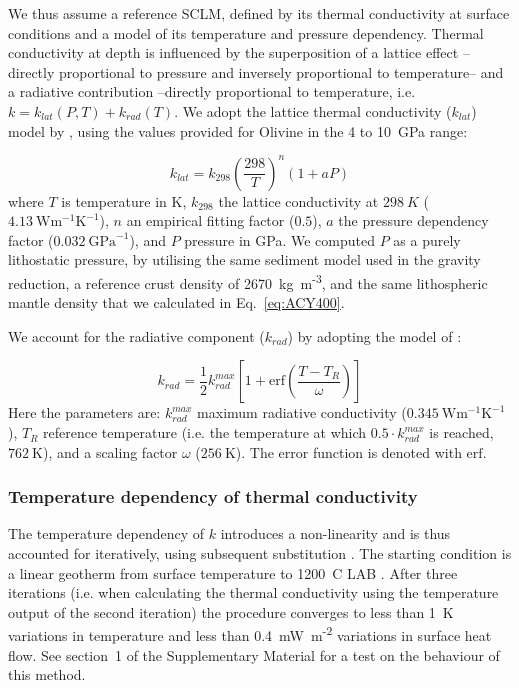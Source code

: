 We thus assume a reference SCLM, defined by its thermal conductivity at surface conditions and a model of its temperature and pressure dependency.
Thermal conductivity at depth is influenced by the superposition of a lattice effect --directly proportional to pressure and inversely proportional to temperature-- and a radiative contribution --directly proportional to temperature, i.e. $k = k_{lat}(P,T) + k_{rad}(T)$.
We adopt the lattice thermal conductivity ($k_{lat}$) model by \textcite{Xu2004}, using the values provided for Olivine in the 4 to 10~GPa range:

\begin{equation}
	\label{kLat}
	k_{lat} = k_{298} \left( \frac{298}{T} \right)^n (1+ a P)
\end{equation}
where $T$ is temperature in K, $k_{298}$ the lattice conductivity at $298~K$ ($4.13~\textrm{W} \textrm{m}^{-1} \textrm{K}^{-1}$), $n$ an empirical fitting factor ($0.5$), $a$ the pressure dependency factor ($0.032~\textrm{GPa}^{-1}$), and $P$ pressure in GPa.
We computed $P$ as a purely lithostatic pressure, by utilising the same sediment model used in the gravity reduction, a reference crust density of 2670~{kg~m\textsuperscript{-3}}, and the same lithospheric mantle density that we calculated in Eq.~\ref{eq:ACY400}.

We account for the radiative component ($k_{rad}$) by adopting the model of \textcite{Hasterok2011cont}:

\begin{equation}
	\label{kRad}
	k_{rad} = \frac{1}{2} k_{rad}^{max}  \left[ 1 + \mathrm{erf} \left( \frac{T-T_R}{\omega} \right) \right]
\end{equation}
Here the parameters are: $k_{rad}^{max}$ maximum radiative conductivity ($0.345~\textrm{W} \textrm{m}^{-1} \textrm{K}^{-1}$), $T_R$ reference temperature (i.e. the temperature at which $0.5 \cdot k_{rad}^{max}$ is reached, $762~\textrm{K}$), and a scaling factor $\omega$ ($256~\textrm{K}$).
The error function is denoted with $\mathrm{erf}$.

\subsubsection{Temperature dependency of thermal conductivity}
\label{sss:ThermCondTdep}
The temperature dependency of $k$ introduces a non-linearity and is thus accounted for iteratively, using subsequent substitution \parencite[or `Picard's method', e.g. ][]{Hauck1999}.
The starting condition is a linear geotherm from surface temperature to 1200~\textdegree C LAB \parencite{fischer2010lab}.
After three iterations (i.e. when calculating the thermal conductivity using the temperature output of the second iteration) the procedure converges to less than 1~K variations in temperature and less than {0.4}~{mW~m\textsuperscript{-2}} variations in surface heat flow.
See section~1 of the Supplementary Material for a test on the behaviour of this method.

